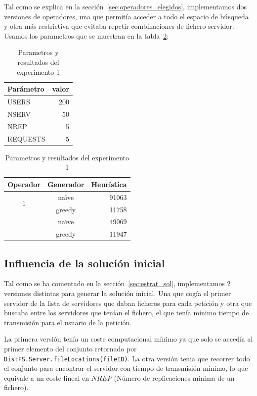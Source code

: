 Tal como se explica en la sección~\ref{sec:operadores_elegidos}, implementamos dos versiones de operadores,
una que permitía acceder a todo el espacio de búsqueda y otra más restrictiva que evitaba repetir combinaciones
de fichero servidor. Usamos los parametros que se muestran en la tabla~\ref{tab:ex1}:
\begin{table}[H]
    \caption{Parametros y resultados del experimento 1}%
    \label{tab:ex1}
    \begin{center}
    \begin{tabular}{lr}
    \toprule
    Parámetro & valor \\
    \midrule
    USERS & 200 \\
    NSERV & 50 \\
    NREP & 5 \\
    REQUESTS & 5\\
    \bottomrule
    \end{tabular}
    \hspace{2em}
    \begin{tabular}{ccr}
    \toprule
    Operador & Generador & Heurística \\
    \midrule
    \multirow{2}{*}{1} & naïve &  91063\\
    {} & greedy & 11758 \\
    \addlinespace[0.5em]
    \multirow{2}{*}{2} & naïve &  49069\\
    {} & greedy & 11947 \\
    \bottomrule
    \end{tabular}
    \end{center}
\end{table}


\subsection{Influencia de la solución inicial}


Tal como se ha comentado en la sección~\ref{sec:estrat_sol}, implementamos 2 versiones distintas
para generar la solución inicial. Una que cogía el primer servidor de la lista de servidores que daban ficheros
para cada petición y otra que buscaba entre los servidores que tenían el fichero, el que tenía mínimo
tiempo de transmisión para el usuario de la petición.

La primera versión tenía un coste computacional mínimo ya que solo se accedía al primer elemento del
conjunto retornado por \texttt{DistFS.Server.fileLocations(fileID)}. La otra versión tenia que recorrer
todo el conjunto para encontrar el servidor con tiempo de transmisión mínimo, lo que equivale a un coste
lineal en $NREP$ (Número de replicaciones mínima de un fichero).

